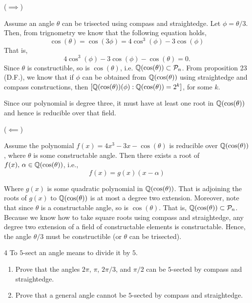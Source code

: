 \documentclass[12pt]{article}
\begin{document}
\begin{solution}
    \bbni
    
    ($\implies$)

    Assume an angle $\theta$ can be trisected using compass and straightedge. Let $\phi = \theta/3$. Then, from trignometry we know that the following equation holds, 
    \[\cos(\theta) = \cos(3\phi) = 4 \cos^3(\phi) - 3 \cos(\phi)\]
    That is, 
    \[4 \cos^3(\phi) - 3 \cos(\phi) - \cos(\theta) = 0.\]
    Since $\theta$ is constructible, so is $\cos(\theta)$, i.e. $\mathbb Q(\cos(\theta)) \subset \mathcal{P}_ n$. From proposition 23 (D.F.), we know that if $\phi$ can be obtained from $\mathbb Q(\cos(\theta))$ using straightedge and compass constructions, then $[\mathbb Q(\cos(\theta))(\phi): \mathbb Q(\cos(\theta)) = 2^k]$, for some $k$. 

    Since our polynomial is degree three, it must have at least one root in $\mathbb Q(\cos(\theta))$ and hence is reducible over that field. 

    ($\impliedby$)

    Assume the polynomial $f(x) = 4x^3 - 3x - \cos(\theta)$ is reducible over $\mathbb Q(\cos(\theta))$, where $\theta$ is some constructable angle. Then there exists a root of $f(x), \, \alpha \in \mathbb Q(\cos(\theta))$, i.e., 
    \[f(x) = g(x)(x - \alpha)\]
    
    Where $g(x)$ is some quadratic polynomial in $\mathbb Q(\cos(\theta))$. That is adjoining the roots of $g(x)$ to $\mathbb Q(\cos(\theta))$ is at most a degree two extension. Moreover, note that since $\theta$ is a constructable angle, so is $\cos(\theta)$. That is, $\mathbb Q(\cos(\theta)) \subset \mathcal{P}_n$. Because we know how to take square roots using compass and straightedge, any degree two extension of a field of constructable elements is constructable. Hence, the angle $\theta/3$ must be constructible (or $\theta$ can be trisected). 
\end{solution}

\newpage 

\begin{problem}{4}
    To $5$-sect an angle means to divide it by $5$.
    \begin{enumerate}
    \item Prove that the angles $2\pi$, $\pi$, $2\pi/3$, and $\pi/2$ can be $5$-sected by compass and straightedge.
    \item Prove that a general angle cannot be $5$-sected by compass and straightedge.
    \end{enumerate}
\end{problem}
\end{document}
